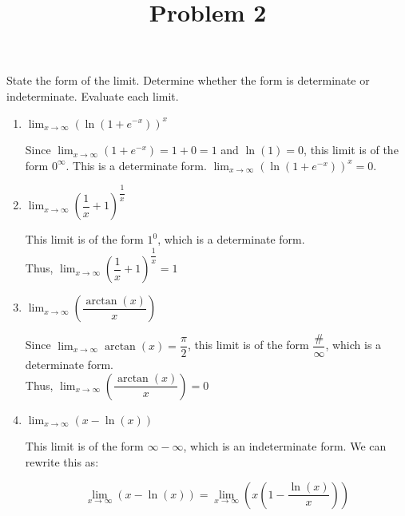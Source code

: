 \documentclass{ximera}
\title[Problem 2]{Problem 2}
\begin{document}
\begin{abstract} \end{abstract}
\maketitle


\begin{problem}

State the form of the limit. Determine whether the form is determinate or indeterminate. Evaluate each limit.  
  \begin{enumerate}
  \item  $\displaystyle \lim_{x \to \infty}\left( \ln (1 + e^{-x}) \right)^x $
    \begin{explanation}
      Since $\displaystyle \lim_{x \to \infty} (1 + e^{-x}) = 1 + 0 = 1$ and $\ln (1) = 0$, this limit is of the form $0^{\infty}$.
      This is a determinate form.
     $\displaystyle \lim_{x \to \infty} \left( \ln (1 + e^{-x}) \right)^x = 0$.
    \end{explanation}
    
  \item  $\displaystyle \lim_{x \to \infty} \left( \dfrac{1}{x} + 1 \right)^{\dfrac{1}{x}} $
    \begin{explanation}
      This limit is of the form $1^0$, which is a determinate form.\\
      Thus, $\displaystyle \lim_{x \to \infty} \left( \dfrac{1}{x} + 1 \right)^{\dfrac{1}{x}} = 1 $
    \end{explanation}
    
  \item  $\displaystyle \lim_{x \to \infty} \left( \dfrac{\arctan(x)}{x} \right) $
    \begin{explanation}
      Since $\displaystyle \lim_{x \to \infty} \arctan(x) = \dfrac{\pi}{2}$, this limit is of the form $\dfrac{\text{\#}}{\infty}$, which is a determinate form.\\[1em]
      Thus, $\displaystyle \lim_{x \to \infty} \left( \dfrac{\arctan(x)}{x} \right) = 0$  
    \end{explanation}
    \item  $\displaystyle \lim_{x \to \infty} (x-\ln(x)) $
    \begin{explanation}
      This limit is of the form $\infty - \infty$, which is an indeterminate form.  We can rewrite this as:
   
      $$\displaystyle \lim_{x \to \infty} (x-\ln(x))= \displaystyle \lim_{x \to \infty} \left(x\left(1-\dfrac{\ln(x)}{x}\right)\right)$$
     

\end{explanation}
\end{enumerate}
\end{problem}
\end{document}
